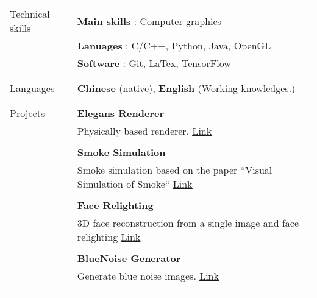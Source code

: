 \documentclass[letterpaper,11pt,oneside]{article}
\begin{document}
\begin{tabular}{@{} l l}
\end{tabular}

\begin{tabular}{@{} l l}
	  
\Large{Technical skills} & \textbf{Main skills \hspace{0.2em}}:  Computer graphics  \\
	& \textbf{Lanuages   \hspace{0.7em} }:  C/C++, Python, Java, OpenGL \\
	& \textbf{Software  \hspace{1em} }:  Git, LaTex, TensorFlow \\
	& \\  
	& \\  

\Large{Languages}   & \textbf{Chinese} (native), \textbf{English} (Working knowledges.) \\
  & \\
  & \\
   
\Large{Projects}   
   & \textbf{Elegans Renderer}\\
   & \parbox{5.0in}{Physically based renderer. \hfill \href{https://github.com/gao-duan/Elegans}{\underline{Link}}} \\
   & \\
   & \textbf{Smoke Simulation}\\
   & \parbox{5.0in}{Smoke simulation based on the paper ``Visual Simulation of Smoke`` \hfill \href{https://github.com/gao-duan/SmokeSimulation}{\underline{Link}}} \\
   & \\
   & \textbf{Face Relighting}\\
   & \parbox{5.0in}{3D face reconstruction from a single image and face relighting \hfill \href{https://github.com/gao-duan/FaceRelighting}{\underline{Link}}} \\
   & \\
   & \textbf{BlueNoise Generator}\\
   & \parbox{5.0in}{Generate blue noise images. \hfill \href{https://github.com/gao-duan/BlueNoise}{\underline{Link}}} \\
   & \\
   & \\
    


\end{tabular}    
\end{document}
